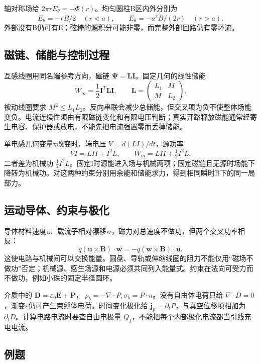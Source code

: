 \documentclass[UTF8,fontset=fandol,zihao=-4,a4paper]{ctexart}
\begin{document}
轴对称场给 \(2\pi rE_\theta=-\dot\Phi(r)\)。均匀圆柱B区内外分别为
\[
E_\theta=-r\dot B/2\quad(r<a),\qquad
E_\theta=-a^2\dot B/(2r)\quad(r>a).
\]
外部没有B仍可有E；弦棒的源积分可能非零，而完整外部回路仍有零环流。

\subsection{磁链、储能与控制过程}
互感线圈用同名端参考方向，磁链 \(\boldsymbol\Psi=\boldsymbol L\boldsymbol I\)。固定几何的线性储能
\[
W_m=\frac12\boldsymbol I^T\boldsymbol L\boldsymbol I,\qquad
\boldsymbol L=\begin{pmatrix}L_1&M\\M&L_2\end{pmatrix}.
\]
被动线圈要求 \(M^2\le L_1L_2\)。反向串联会减少总储能，但交叉项为负不使整体场能变负。电流连续性须由有限磁链变化和有限电压判断；真实开路释放磁能通常经寄生电容、保护器或放电，不能先把电流强置零而丢掉储能。

单电感几何变量x改变时，端电压 \(V=d(LI)/dt\)，源功率
\[
VI=LI\dot I+I^2\dot L,\qquad
\dot W_m=LI\dot I+\tfrac12I^2\dot L.
\]
二者差为机械功 \(\tfrac12I^2\dot L\)。固定I时源能进入场与机械两项；固定磁链且无源时场能下降转为机械功。对这两种约束分别用余能和储能求力，得到相同瞬时B下的同一局部力。

\subsection{运动导体、约束与极化}
导体材料速度u、载流子相对漂移w，磁力对总速度不做功，但两个交叉功率相反：
\[
q(\boldsymbol u\times\boldsymbol B)\cdot\boldsymbol w
=-q(\boldsymbol w\times\boldsymbol B)\cdot\boldsymbol u.
\]
这使电路与机械间可以交换能量。圆盘、导轨或伸缩线圈的阻力不能仅用“磁场不做功”否定；机械源、感生场源和电源必须共同列入能量式。约束在法向可受力而不做功，例如小珠的固定半径圆环。

介质中的 \(\boldsymbol D=\varepsilon_0\boldsymbol E+\boldsymbol P\)，
\(\rho_b=-\nabla\cdot P,\sigma_b=P\cdot n\)。没有自由体电荷只给 \(\nabla\cdot D=0\)，渐变\(\varepsilon\)仍可产生束缚体电荷。时间变化极化给 \(\boldsymbol j_p=\partial_tP\)，与真空位移项相加为 \(\partial_tD\)。计算电路电流时要查自由电极量 \(Q_f\)，不能把每个内部极化电流都当引线充电电流。


\needspace{110mm}

\subsection*{例题}
\end{document}

